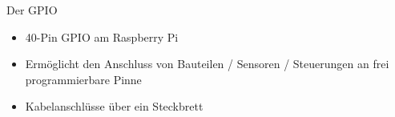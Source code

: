 \documentclass[usenames,dvipsnames]{beamer}
\begin{document}
\begin{frame}{Der GPIO}
	\begin{minipage}[t][2cm]{\textwidth}
		\begin{itemize}
			\item 40-Pin GPIO am Raspberry Pi
			\item Ermöglicht den Anschluss von Bauteilen / Sensoren / Steuerungen an frei programmierbare Pinne
			\item<2-> Kabelanschlüsse über ein Steckbrett
		\end{itemize}
	\end{minipage}

	\begin{minipage}[t][6.1 cm]{\textwidth}
\end{minipage}
\end{frame}
\end{document}
